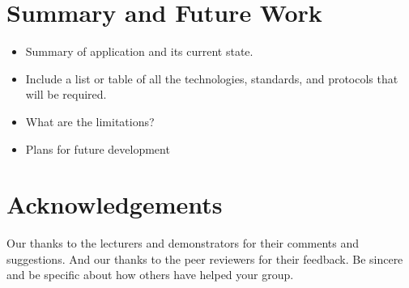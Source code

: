 \documentclass{sig-alt-release2}
\begin{document}
\section{Summary and Future Work}
\begin{itemize}
\item	Summary of application and its current state.
\item	Include a list or table of all the technologies, standards, and protocols that will be required.
\item	What are the limitations?
\item Plans for future development
\end{itemize}

\section{Acknowledgements}
Our thanks to the lecturers and demonstrators for their comments and suggestions. And our thanks to the peer reviewers for their feedback.
Be sincere and be specific about how others have helped your group.




\end{document}
